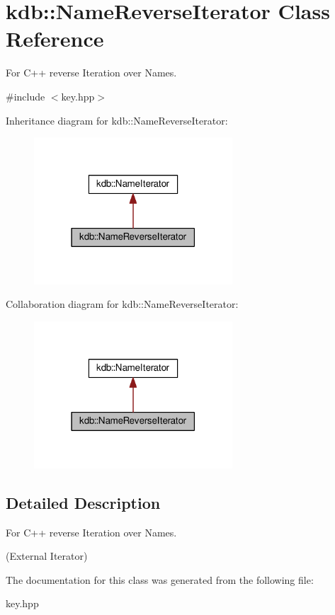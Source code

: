 \hypertarget{classkdb_1_1NameReverseIterator}{\section{kdb\+:\+:Name\+Reverse\+Iterator Class Reference}
\label{classkdb_1_1NameReverseIterator}
}


For C++ reverse Iteration over Names.  




{\ttfamily \#include $<$key.\+hpp$>$}



Inheritance diagram for kdb\+:\+:Name\+Reverse\+Iterator\+:
\nopagebreak
\begin{figure}[H]
\begin{center}
\leavevmode
\includegraphics[width=210pt]{classkdb_1_1NameReverseIterator__inherit__graph}
\end{center}
\end{figure}


Collaboration diagram for kdb\+:\+:Name\+Reverse\+Iterator\+:
\nopagebreak
\begin{figure}[H]
\begin{center}
\leavevmode
\includegraphics[width=210pt]{classkdb_1_1NameReverseIterator__coll__graph}
\end{center}
\end{figure}


\subsection{Detailed Description}
For C++ reverse Iteration over Names. 

(External Iterator) 

The documentation for this class was generated from the following file\+:\begin{DoxyCompactItemize}
\item 
key.\+hpp\end{DoxyCompactItemize}
